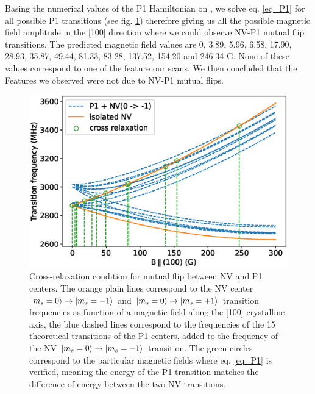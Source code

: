 \documentclass{article}
\begin{document}
Basing the numerical values of the P1 Hamiltonian on \citep{lazda2020cross}, we solve eq. \ref{eq_P1} for all possible P1 transitions (see fig. \ref{fig_P1}) therefore giving us all the possible magnetic field amplitude in the [100] direction where we could observe NV-P1 mutual flip transitions. The predicted magnetic field values are 0, 3.89, 5.96, 6.58, 17.90, 28.93, 35.87, 49.44, 81.33, 83.28, 137.52, 154.20 and 246.34 G. None of these values correspond to one of the feature our scans. We then concluded that the Features we observed were not due to NV-P1 mutual flips. 
\begin{figure}
\label{fig_P1}
\includegraphics[scale=.6]{Transis_P1}
\caption{Cross-relaxation condition for mutual flip between NV and P1 centers. The orange plain lines correspond to the NV center $\ket{m_s=0} \to \ket{m_s=-1}$ and $\ket{m_s=0} \to \ket{m_s=+1}$ transition frequencies as function of a magnetic field along the [100] crystalline axis, the blue dashed lines correspond to the frequencies of the 15 theoretical transitions of the P1 centers, added to the frequency of the NV $\ket{m_s=0} \to \ket{m_s=-1}$ transition. The green circles correspond to the particular magnetic fields where eq. \ref{eq_P1} is verified, meaning the energy of the P1 transition matches the difference of energy between the two NV transitions.}
\end{figure}

\end{document}
